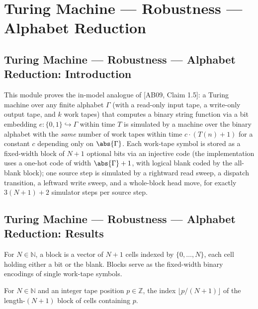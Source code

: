 \section{Turing Machine --- Robustness --- Alphabet Reduction}
\subsection*{Turing Machine --- Robustness --- Alphabet Reduction: Introduction}

This module proves the in-model analogue of [AB09, Claim 1.5]: a Turing machine over any
finite alphabet $\Gamma$ (with a read-only input tape, a write-only output tape, and $k$
work tapes) that computes a binary string function via a bit embedding
$e : \{0,1\} \hookrightarrow \Gamma$ within time $T$ is simulated by a machine over the
binary alphabet with the \emph{same} number of work tapes within time $c \cdot (T(n)+1)$
for a constant $c$ depending only on $\abs{\Gamma}$. Each work-tape symbol is stored as a
fixed-width block of $N+1$ optional bits via an injective code (the implementation uses a
one-hot code of width $\abs{\Gamma}+1$, with logical blank coded by the all-blank block);
one source step is simulated by a rightward read sweep, a dispatch transition, a leftward
write sweep, and a whole-block head move, for exactly $3(N+1)+2$ simulator steps per
source step.

\subsection*{Turing Machine --- Robustness --- Alphabet Reduction: Results}

\begin{definition}
\label{Turing.FinTM.ArBlock}
\leanok
For $N \in \mathbb{N}$, a block is a vector of $N+1$ cells indexed by
$\{0,\dots,N\}$, each cell holding either a bit or the blank. Blocks serve as the
fixed-width binary encodings of single work-tape symbols.
\end{definition}

\begin{definition}
\label{Turing.FinTM.arCell}
\leanok
For $N \in \mathbb{N}$ and an integer tape position $p \in \mathbb{Z}$, the index
$\lfloor p/(N+1) \rfloor$ of the length-$(N+1)$ block of cells containing $p$.
\end{definition}

